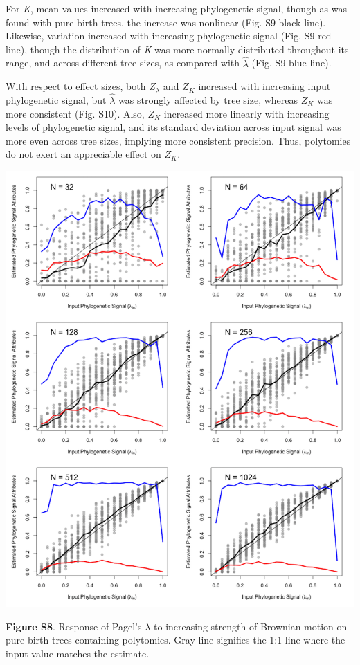 \documentclass[
]{article}
\begin{document}
For \emph{K}, mean values increased with increasing phylogenetic signal,
though as was found with pure-birth trees, the increase was nonlinear
(Fig. S9 black line). Likewise, variation increased with increasing
phylogenetic signal (Fig. S9 red line), though the distribution of
\emph{K} was more normally distributed throughout its range, and across
different tree sizes, as compared with \(\hat{\lambda}\) (Fig. S9 blue
line). \hfill\break

With respect to effect sizes, both \(Z_{\lambda}\) and \(Z_K\) increased
with increasing input phylogenetic signal, but \(\hat{\lambda}\) was
strongly affected by tree size, whereas \(Z_K\) was more consistent
(Fig. S10). Also, \(Z_K\) increased more linearly with increasing levels
of phylogenetic signal, and its standard deviation across input signal
was more even across tree sizes, implying more consistent precision.
Thus, polytomies do not exert an appreciable effect on \(Z_K\).

\includegraphics[width=0.95\linewidth]{fig.S8}

\textbf{Figure S8}. Response of Pagel's \(\lambda\) to increasing
strength of Brownian motion on pure-birth trees containing polytomies.
Gray line signifies the 1:1 line where the input value matches the
estimate.
\end{document}

